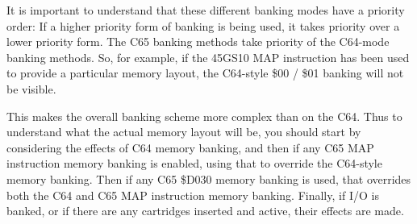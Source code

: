 It is important to understand that these different banking modes have
a priority order: If a higher priority form of banking is being used,
it takes priority over a lower priority form.  The C65 banking methods
take priority of the C64-mode banking methods.  So, for example, if
the 45GS10 MAP instruction has been used to provide a particular
memory layout, the C64-style \$00 / \$01 banking will not be visible.

This makes the overall banking scheme more complex than on the C64.
Thus to understand what the actual memory layout will be, you should
start by considering the effects of C64 memory banking, and then if
any C65 MAP instruction memory banking is enabled, using that to override the
C64-style memory banking. Then if any C65 \$D030 memory banking is
used, that overrides both the C64 and C65 MAP instruction memory
banking. Finally, if I/O is banked, or if there are any cartridges
inserted and active, their effects are made.

